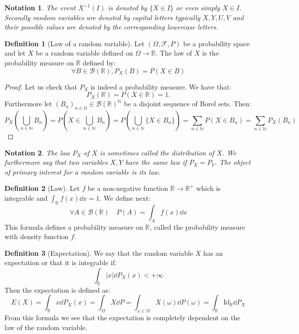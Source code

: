 \documentclass[10pt,a4paper]{book}
\newtheorem*{notation}{Notation}
\theoremstyle{definition}
\newtheorem{definition}{Definition}[section]
\begin{document}
\begin{notation}
The event $X^{-1}(I)$ is denoted by $\{X \in I\}$ or even simply $X \in I$. Secondly random variables are denoted by capital letters typically $X, Y, U, V$ and their possible values are denoted by the corresponding lowercase letters.
\end{notation}

\begin{definition}[Law of a random variable]
Let $(\Omega, \mathcal{F}, P)$ be a probability space and let $X$ be a random variable defined on $\Omega \to \mathbb{R}$. The law of $X$ is the probability measure on $\mathbb{R}$ defined by:
\[
\forall B \in \mathcal{B}(\mathbb{R}), P_X(B) = P(X \in B)
\]
\end{definition}

\begin{proof}
Let us check that $P_X$ is indeed a probability measure. We have that:
\[
P_X(\mathbb{R}) = P(X \in \mathbb{R}) = 1.
\]
Furthermore let $(B_n)_{n \in \mathbb{N}} \in \mathcal{B}(\mathbb{R})^\mathbb{N}$ be a disjoint sequence of Borel sets. Then:
\[
P_X\left(\bigcup_{n \in \mathbb{N}} B_n\right) = P\left(X \in \bigcup_{n\in\mathbb{N}} B_n\right) = P\left( \bigcup_{n\in\mathbb{N}} \{ X \in B_n \} \right) = \sum_{n \in \mathbb{N}} P(X \in B_n) = \sum_{n \in \mathbb{N}} P_X(B_n)
\]
\end{proof}

\begin{notation}
The law $P_X$ of $X$ is sometimes called the \textit{distribution} of $X$. We furthermore say that two variables $X, Y$ have the same law if $P_X = P_Y$. The object of primary interest for a random variable is its law.
\end{notation}

\begin{definition}[Law]
Let $f$ be a non-negative function $\mathbb{R} \to \mathbb{R}^+$ which is integrable and $\int_\mathbb{R} f(x) \dd x = 1$. We define next:
\[
\forall A \in \mathcal{B}(\mathbb{R}) \quad P(A) = \int_A f(x) \dd x
\]
This formula defines a probability measure on $\mathbb{R}$, called the probability measure with density function $f$.
\end{definition}

\begin{definition}[Expectation]
We say that the random variable $X$ has an expectation or that it is integrable if:
\[
\int_\mathbb{R} |x| \dd P_X(x) < +\infty
\]
Then the expectation is defined as:
\[
E(X) = \int_\mathbb{R} x \dd P_X(x) = \int_\Omega X \dd P = \int_{\omega \in \Omega} X(\omega)\dd P(\omega) = \int_\mathbb{R} \text{Id}_\mathbb{R} \dd P_X
\]
From this formula we see that the expectation is completely dependent on the law of the random variable.
\end{definition}
\end{document}
